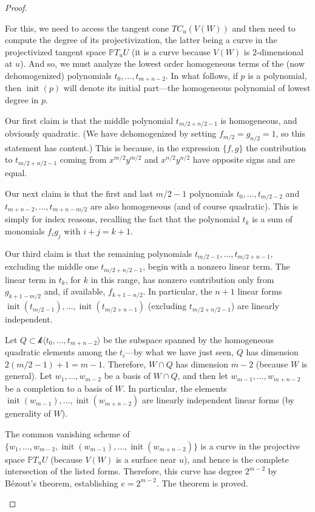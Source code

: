 \documentclass[12pt]{article}
\theoremstyle{plain}
\theoremstyle{remark}
\renewcommand{\P}{\mathbb{P}}
\newcommand{\init}{\operatorname{init}}
\renewcommand{\k}{\mathscr{k}}
\begin{document}
\begin{proof}
\begin{enumerate}
        For this, we need to access the tangent cone $TC_{u}(V(W))$ and then need to compute the degree of its projectivization, the latter being a curve in the projectivized tangent space $\P T_{u} U$ (it is a curve because $V(W)$ is $2$-dimensional at $u$).  And so, we must analyze the lowest order homogeneous terms of the (now dehomogenized) polynomials $t_0, \dots, t_{m+n-2}$. In what follows, if $p$ is a polynomial, then $\init(p)$ will denote its initial part---the homogeneous polynomial of lowest degree in $p$.

        Our first claim is that the middle polynomial $t_{m/2 +n/2 - 1}$ is homogeneous, and obviously quadratic. (We have dehomogenized by setting $f_{m/2} = g_{n/2} = 1$, so this statement has content.) This is because, in the expression $\{f,g\}$ the contribution to $t_{m/2 +n/2 - 1}$ coming from $x^{m/2}y^{m/2}$ and $x^{n/2}y^{n/2}$ have opposite signs and are equal.

        Our next claim is that the first and last $m/2-1$ polynomials $t_0, \dots, t_{m/2-2}$ and $t_{m+n-2}, \dots, t_{m+n-m/2}$ are also homogeneous (and of course quadratic).  This is simply for index reasons, recalling the fact that the polynomial $t_k$ is a sum of monomials $f_{i}g_{j}$ with $i+j = k+1$.

        Our third claim is that the remaining polynomials $t_{m/2-1}, \dots, t_{m/2+n-1}$, excluding the middle one $t_{m/2+n/2-1}$, begin with a nonzero linear term.  The linear term in $t_{k}$, for $k$ in this range, has nonzero contribution only from $g_{k+1-m/2}$ and, if available, $f_{k+1-n/2}$.  In particular, the $n+1$ linear forms $\init(t_{m/2-1}), \dots, \init(t_{m/2+n-1})$ (excluding $t_{m/2+n/2-1}$) are linearly independent.

        Let $Q \subset \k \langle t_0, \dots, t_{m+n-2} \rangle$ be the subspace spanned by the homogeneous quadratic elements among the $t_{i}$---by what we have just seen, $Q$ has dimension $2(m/2-1)+1 = m-1$.  Therefore, $W \cap Q$ has dimension $m-2$ (because $W$ is general). Let $w_{1}, \dots, w_{m-2}$ be a basis of $W \cap Q$, and then let $w_{m-1}, \dots, w_{m+n-2}$ be a completion to a basis of $W$.  In particular, the elements $\init(w_{m-1}), \dots, \init(w_{m+n-2})$ are linearly independent linear forms (by generality of $W$).

        The common vanishing scheme of $\{w_{1}, \dots, w_{m-2},\init(w_{m-1}), \dots, \init(w_{m+n-2})\}$ is a curve in the projective space $\P T_{u}U$ (because $V(W)$ is a surface near $u$), and hence is the complete intersection of the listed forms. Therefore, this curve has degree $2^{m-2}$ by B\'ezout's theorem, establishing $e = 2^{m-2}$. The theorem is proved.
    \end{enumerate}
    \end{proof}
\end{document}
